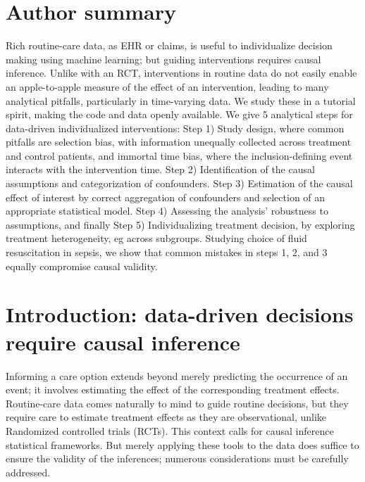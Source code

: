 \documentclass[10pt,letterpaper]{article}
\begin{document}
\section*{Author summary}

Rich routine-care data, as EHR or claims, is useful to individualize decision
making using machine learning; but guiding interventions requires
causal inference. Unlike with an RCT, interventions in routine data do
not easily enable an apple-to-apple measure of the effect of an
intervention, leading to many analytical pitfalls, particularly in
time-varying data. We study these in a tutorial spirit, making
the code and data openly available. We give 5 analytical steps for
data-driven individualized interventions: Step
1) Study design, where common pitfalls are selection bias, with information
unequally collected across treatment and control patients, and immortal time
bias, where the inclusion-defining event interacts with the
intervention time. Step 2) Identification of the causal assumptions and
categorization of confounders. Step 3) Estimation of the causal effect of
interest by correct aggregation of confounders and selection of an appropriate
statistical model. Step 4) Assessing the
analysis' robustness to assumptions, and finally Step 5) Individualizing
treatment decision, by exploring treatment heterogeneity, eg across subgroups.
Studying choice of fluid resuscitation in sepsis, we show that common
mistakes in steps 1, 2, and 3 equally compromise causal validity.


\linenumbers

\section*{Introduction: data-driven decisions require causal inference}

Informing a care option extends beyond merely predicting the occurrence
of an event; it involves estimating the effect of the corresponding
treatment effects. Routine-care data comes naturally to mind to guide
routine decisions, but they require care to estimate treatment effects as
they are observational, unlike Randomized controlled trials (RCTs). This
context calls for causal inference statistical frameworks.
But merely applying these tools to the data does suffice to ensure the
validity of the inferences; numerous considerations must be carefully addressed.
\end{document}
